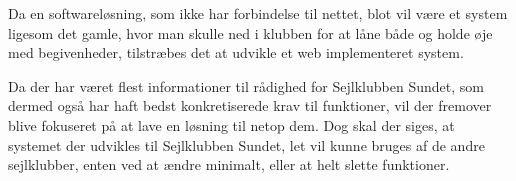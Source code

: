 Da en softwareløsning, som ikke har forbindelse til nettet, blot vil være et system ligesom det gamle, hvor
man skulle ned i klubben for at låne både og holde øje med begivenheder, tilstræbes det at udvikle et web
implementeret system.

Da der har været flest informationer til rådighed for Sejlklubben Sundet, som dermed også har haft bedst
konkretiserede krav til funktioner, vil der fremover blive fokuseret på at lave en løsning til netop dem. Dog
skal der siges, at systemet der udvikles til Sejlklubben Sundet, let vil kunne bruges af de andre sejlklubber,
enten ved at ændre minimalt, eller at helt slette funktioner.
